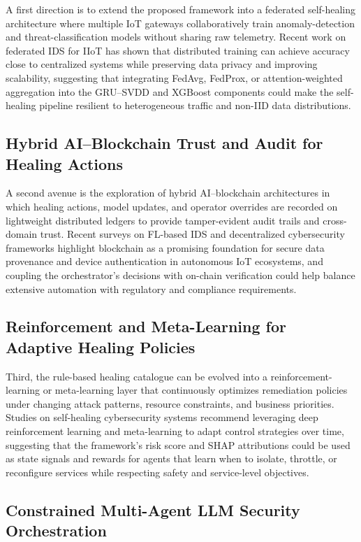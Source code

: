 A first direction is to extend the proposed framework into a federated self-healing architecture where multiple IoT gateways collaboratively train anomaly-detection and threat-classification models without sharing raw telemetry. Recent work on federated IDS for IIoT has shown that distributed training can achieve accuracy close to centralized systems while preserving data privacy and improving scalability, suggesting that integrating FedAvg, FedProx, or attention-weighted aggregation into the GRU--SVDD and XGBoost components could make the self-healing pipeline resilient to heterogeneous traffic and non-IID data distributions.

\subsection{Hybrid AI--Blockchain Trust and Audit for Healing Actions}

A second avenue is the exploration of hybrid AI--blockchain architectures in which healing actions, model updates, and operator overrides are recorded on lightweight distributed ledgers to provide tamper-evident audit trails and cross-domain trust. Recent surveys on FL-based IDS and decentralized cybersecurity frameworks highlight blockchain as a promising foundation for secure data provenance and device authentication in autonomous IoT ecosystems, and coupling the orchestrator's decisions with on-chain verification could help balance extensive automation with regulatory and compliance requirements.

\subsection{Reinforcement and Meta-Learning for Adaptive Healing Policies}

Third, the rule-based healing catalogue can be evolved into a reinforcement-learning or meta-learning layer that continuously optimizes remediation policies under changing attack patterns, resource constraints, and business priorities. Studies on self-healing cybersecurity systems recommend leveraging deep reinforcement learning and meta-learning to adapt control strategies over time, suggesting that the framework's risk score and SHAP attributions could be used as state signals and rewards for agents that learn when to isolate, throttle, or reconfigure services while respecting safety and service-level objectives.

\subsection{Constrained Multi-Agent LLM Security Orchestration}

